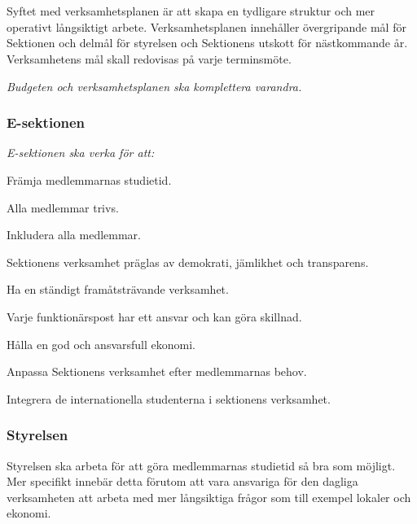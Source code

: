 \documentclass[10pt]{article}
\begin{document}
    \section*{\doctitle}
    Syftet med verksamhetsplanen är att skapa en tydligare struktur och mer operativt långsiktigt arbete. Verksamhetsplanen innehåller övergripande mål för Sektionen och delmål för styrelsen och Sektionens utskott för nästkommande år. Verksamhetens mål skall redovisas på varje terminsmöte.

    \emph{Budgeten och verksamhetsplanen ska komplettera varandra.}
    
    \subsubsection*{E-sektionen}
    \emph{E-sektionen ska verka för att:}
    \begin{dashlist}
        \item Främja medlemmarnas studietid. 
        \item Alla medlemmar trivs.
        \item Inkludera alla medlemmar. 
        \item Sektionens verksamhet präglas av demokrati, jämlikhet och transparens.
        \item Ha en ständigt framåtsträvande verksamhet. 
        \item Varje funktionärspost har ett ansvar och kan göra skillnad. 
        \item Hålla en god och ansvarsfull ekonomi. 
        \item Anpassa Sektionens verksamhet efter medlemmarnas behov.
        \item Integrera de internationella studenterna i sektionens verksamhet.
    \end{dashlist}
    
    \subsubsection*{Styrelsen}
    Styrelsen ska arbeta för att göra medlemmarnas studietid så bra som möjligt. Mer specifikt innebär detta förutom att vara ansvariga för den dagliga verksamheten att arbeta med mer långsiktiga frågor som till exempel lokaler och ekonomi.
    
\end{document}
